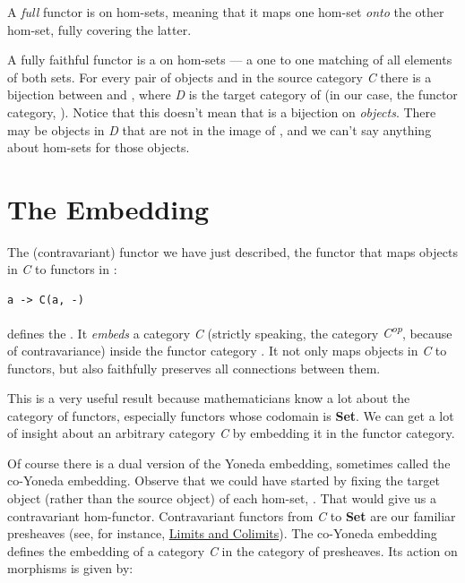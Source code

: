 A \emph{full} functor is  on hom-sets, meaning that it
maps one hom-set \emph{onto} the other hom-set, fully covering the
latter.

A fully faithful functor  is a  on hom-sets
--- a one to one matching of all elements of both sets. For every pair
of objects  and  in the source category \emph{C}
there is a bijection between  and
, where \emph{D} is the target category of
 (in our case, the functor category, \code{{[}C, Set{]}}).
Notice that this doesn't mean that  is a bijection on
\emph{objects}. There may be objects in \emph{D} that are not in the
image of , and we can't say anything about hom-sets for those
objects.

\section{The Embedding}\label{the-embedding}

The (contravariant) functor we have just described, the functor that
maps objects in \emph{C} to functors in \code{{[}C, Set{]}}:

\begin{Verbatim}[commandchars=\\\{\}]
a -> C(a, -)
\end{Verbatim}
defines the . It \emph{embeds} a category
\emph{C} (strictly speaking, the category \emph{C\textsuperscript{op}},
because of contravariance) inside the functor category
\code{{[}C, Set{]}}. It not only maps objects in \emph{C} to
functors, but also faithfully preserves all connections between them.

This is a very useful result because mathematicians know a lot about the
category of functors, especially functors whose codomain is
\textbf{Set}. We can get a lot of insight about an arbitrary category
\emph{C} by embedding it in the functor category.

Of course there is a dual version of the Yoneda embedding, sometimes
called the co-Yoneda embedding. Observe that we could have started by
fixing the target object (rather than the source object) of each
hom-set, . That would give us a contravariant
hom-functor. Contravariant functors from \emph{C} to \textbf{Set} are
our familiar presheaves (see, for instance,
\hyperref[limits-and-colimits]{Limits
and Colimits}). The co-Yoneda embedding defines the embedding of a
category \emph{C} in the category of presheaves. Its action on morphisms
is given by:

